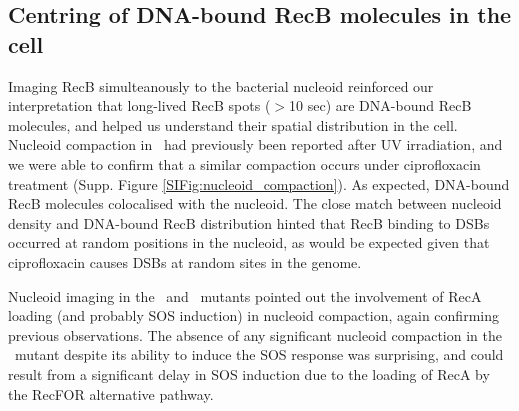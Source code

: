 \subsection*{Centring of DNA-bound RecB molecules in the cell}
Imaging RecB simulteanously to the bacterial nucleoid reinforced our interpretation that long-lived RecB spots ($>$10 sec) are DNA-bound RecB molecules, and helped us understand their spatial distribution in the cell. Nucleoid compaction in \ecoli\ had previously been reported after UV irradiation\cite{Odsbu2014}, and we were able to confirm that a similar compaction occurs under ciprofloxacin treatment (Supp. Figure \ref{SIFig:nucleoid_compaction}). As expected, DNA-bound RecB molecules colocalised with the nucleoid. The close match between nucleoid density and DNA-bound RecB distribution hinted that RecB binding to DSBs occurred at random positions in the nucleoid, as would be expected given that ciprofloxacin causes DSBs at random sites in the genome.

Nucleoid imaging in the \dreca\ and \geneteneighty\ mutants pointed out the involvement of RecA loading (and probably SOS induction) in nucleoid compaction, again confirming previous observations\cite{Odsbu2014}. The absence of any significant nucleoid compaction in the \geneteneighty\ mutant despite its ability to induce the SOS response was surprising, and could result from a significant delay in SOS induction due to the loading of RecA by the RecFOR alternative pathway.
